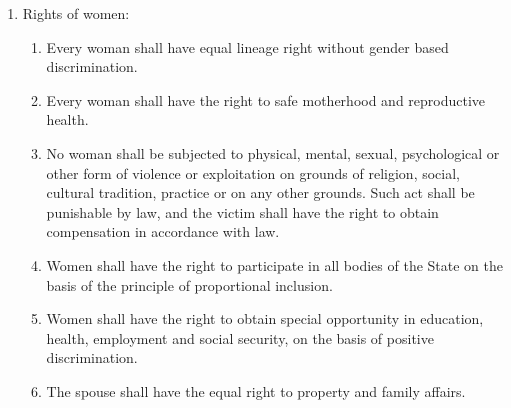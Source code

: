 \begin{questions}
\begin{solution}
\begin{enumerate}
\item Rights of women:
\begin{enumerate}
    \item Every woman shall have equal lineage right without gender based discrimination.
    \item Every woman shall have the right to safe motherhood and reproductive health.
    \item No woman shall be subjected to physical, mental, sexual, psychological or other form of violence or exploitation on grounds of religion, social, cultural tradition, practice or on any other grounds. Such act shall be punishable by law, and the victim shall have the right to obtain compensation in accordance with law.
    \item Women shall have the right to participate in all bodies of the State on the basis of the principle of proportional inclusion.
    \item Women shall have the right to obtain special opportunity in education, health, employment and social security, on the basis of positive discrimination.
    \item The spouse shall have the equal right to property and family affairs.
\end{enumerate}


\end{enumerate}
\end{solution}
\end{questions}
